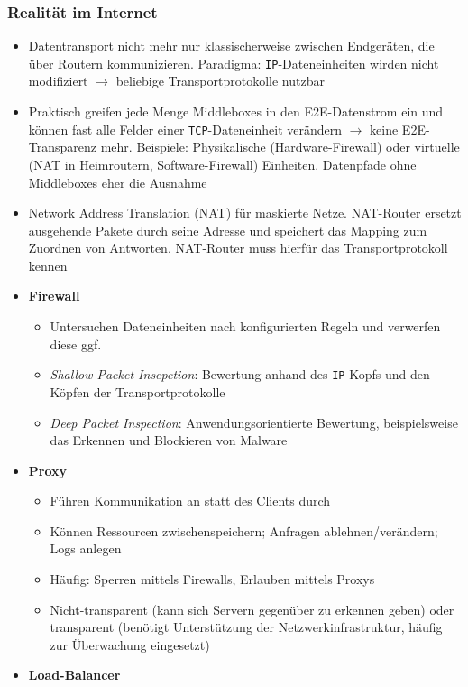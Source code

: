\subsubsection{Realität im Internet}
\begin{itemize}
	\item Datentransport nicht mehr nur klassischerweise zwischen Endgeräten, die über Routern kommunizieren. Paradigma: \texttt{IP}-Dateneinheiten wirden nicht modifiziert \(\rightarrow\) beliebige Transportprotokolle nutzbar
	\item Praktisch greifen jede Menge Middleboxes in den E2E-Datenstrom ein und können fast alle Felder einer \texttt{TCP}-Dateneinheit verändern \(\rightarrow\) keine E2E-Transparenz mehr. Beispiele: Physikalische (Hardware-Firewall) oder virtuelle (NAT in Heimroutern, Software-Firewall) Einheiten. Datenpfade ohne Middleboxes eher die Ausnahme
	\item Network Address Translation (NAT) für maskierte Netze. NAT-Router ersetzt ausgehende Pakete durch seine Adresse und speichert das Mapping zum Zuordnen von Antworten. NAT-Router muss hierfür das Transportprotokoll kennen
	\item \textbf{Firewall}
	\begin{itemize}
		\item Untersuchen Dateneinheiten nach konfigurierten Regeln und verwerfen diese ggf.
		\item \textit{Shallow Packet Insepction}: Bewertung anhand des \texttt{IP}-Kopfs und den Köpfen der Transportprotokolle
		\item \textit{Deep Packet Inspection}: Anwendungsorientierte Bewertung, beispielsweise das Erkennen und Blockieren von Malware
	\end{itemize}
	\item \textbf{Proxy}
	\begin{itemize}
		\item Führen Kommunikation an statt des Clients durch
		\item Können Ressourcen zwischenspeichern; Anfragen ablehnen/verändern; Logs anlegen
		\item Häufig: Sperren mittels Firewalls, Erlauben mittels Proxys
		\item Nicht-transparent (kann sich Servern gegenüber zu erkennen geben) oder transparent (benötigt Unterstützung der Netzwerkinfrastruktur, häufig zur Überwachung eingesetzt)
	\end{itemize}
	\item \textbf{Load-Balancer}
	\begin{itemize}

\end{itemize}
\end{itemize}
